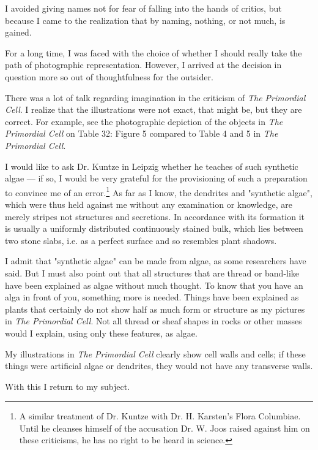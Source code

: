 \documentclass[a4paper, 11pt, oneside]{article}
\begin{document}
I avoided giving names not for fear of falling into the hands of critics, but because I came to the realization that by naming, nothing, or not much, is gained.

For a long time, I was faced with the choice of whether I should really take the path of photographic representation. However, I arrived at the decision in question more so out of thoughtfulness for the outsider.

There was a lot of talk regarding imagination in the criticism of \emph{The Primordial Cell}. I realize that the illustrations were not exact, that might be, but they are correct. For example, see the photographic depiction of the objects in \emph{The Primordial Cell} on Table 32: Figure 5 compared to Table 4 and 5 in \emph{The Primordial Cell}.

I would like to ask Dr. Kuntze in Leipzig whether he teaches of such synthetic algae — if so, I would be very grateful for the provisioning of such a preparation to convince me of an error.\footnote{A similar treatment of Dr. Kuntze with Dr. H. Karsten's Flora Columbiae. Until he cleanses himself of the accusation Dr. W. Joos raised against him on these criticisms, he has no right to be heard in science.} As far as I know, the dendrites and "synthetic algae", which were thus held against me without any examination or knowledge, are merely stripes not structures and secretions. In accordance with its formation it is usually a uniformly distributed continuously stained bulk, which lies between two stone slabs, i.e. as a perfect surface and so resembles plant shadows.

I admit that "synthetic algae" can be made from algae, as some researchers have said. But I must also point out that all structures that are thread or band-like have been explained as algae without much thought. To know that you have an alga in front of you, something more is needed. Things have been explained as plants that certainly do not show half as much form or structure as my pictures in \emph{The Primordial Cell}. Not all thread or sheaf shapes in rocks or other masses would I explain, using only these features, as algae.

My illustrations in \emph{The Primordial Cell} clearly show cell walls and cells; if these things were artificial algae or dendrites, they would not have any transverse walls.

With this I return to my subject.
\end{document}
